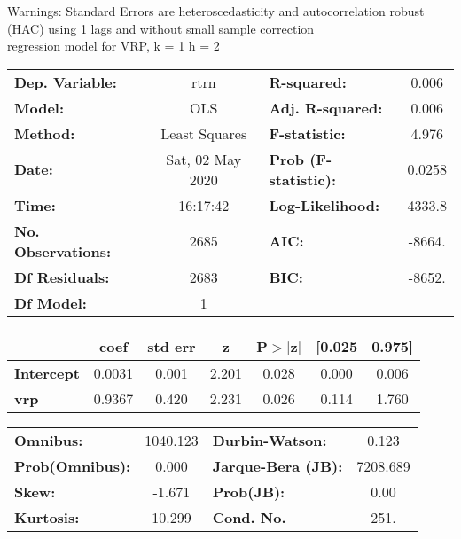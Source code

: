 Warnings: \newline
 [1] Standard Errors are heteroscedasticity and autocorrelation robust (HAC) using 1 lags and without small sample correction\\ 

regression model for VRP, k = 1 h = 2\begin{center}
\begin{tabular}{lclc}
\toprule
\textbf{Dep. Variable:}    &       rtrn       & \textbf{  R-squared:         } &     0.006   \\
\textbf{Model:}            &       OLS        & \textbf{  Adj. R-squared:    } &     0.006   \\
\textbf{Method:}           &  Least Squares   & \textbf{  F-statistic:       } &     4.976   \\
\textbf{Date:}             & Sat, 02 May 2020 & \textbf{  Prob (F-statistic):} &   0.0258    \\
\textbf{Time:}             &     16:17:42     & \textbf{  Log-Likelihood:    } &    4333.8   \\
\textbf{No. Observations:} &        2685      & \textbf{  AIC:               } &    -8664.   \\
\textbf{Df Residuals:}     &        2683      & \textbf{  BIC:               } &    -8652.   \\
\textbf{Df Model:}         &           1      & \textbf{                     } &             \\
\bottomrule
\end{tabular}
\begin{tabular}{lcccccc}
                   & \textbf{coef} & \textbf{std err} & \textbf{z} & \textbf{P$> |$z$|$} & \textbf{[0.025} & \textbf{0.975]}  \\
\midrule
\textbf{Intercept} &       0.0031  &        0.001     &     2.201  &         0.028        &        0.000    &        0.006     \\
\textbf{vrp}       &       0.9367  &        0.420     &     2.231  &         0.026        &        0.114    &        1.760     \\
\bottomrule
\end{tabular}
\begin{tabular}{lclc}
\textbf{Omnibus:}       & 1040.123 & \textbf{  Durbin-Watson:     } &    0.123  \\
\textbf{Prob(Omnibus):} &   0.000  & \textbf{  Jarque-Bera (JB):  } & 7208.689  \\
\textbf{Skew:}          &  -1.671  & \textbf{  Prob(JB):          } &     0.00  \\
\textbf{Kurtosis:}      &  10.299  & \textbf{  Cond. No.          } &     251.  \\
\bottomrule
\end{tabular}
\end{center}

